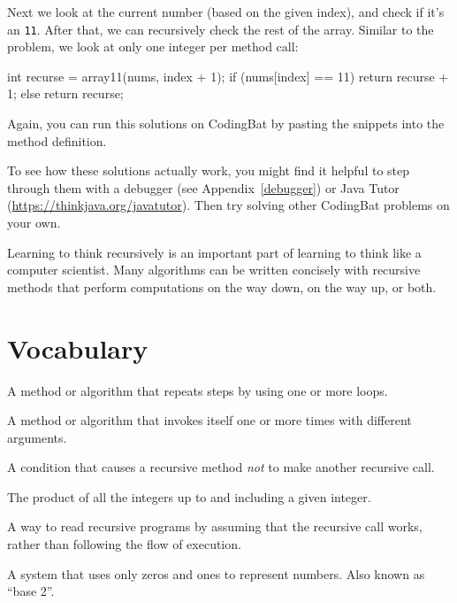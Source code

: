 Next we look at the current number (based on the given index), and check if it's an {\tt 11}.
After that, we can recursively check the rest of the array.
Similar to the  problem, we look at only one integer per method call:

\begin{code}
int recurse = array11(nums, index + 1);
if (nums[index] == 11) {
    return recurse + 1;
} else {
    return recurse;
}
\end{code}

Again, you can run this solutions on CodingBat by pasting the snippets into the method definition.


To see how these solutions actually work, you might find it helpful to step through them with a debugger (see Appendix~\ref{debugger}) or Java Tutor (\url{https://thinkjava.org/javatutor}).
Then try solving other CodingBat problems on your own.

Learning to think recursively is an important part of learning to think like a computer scientist.
Many algorithms can be written concisely with recursive methods that perform computations on the way down, on the way up, or both.


\section{Vocabulary}

\begin{description}



A method or algorithm that repeats steps by using one or more loops.

A method or algorithm that invokes itself one or more times with different arguments.


A condition that causes a recursive method {\em not} to make another recursive call.


The product of all the integers up to and including a given integer.

A way to read recursive programs by assuming that the recursive call works, rather than following the flow of execution.

A system that uses only zeros and ones to represent numbers.
Also known as ``base 2''.

\end{description}


